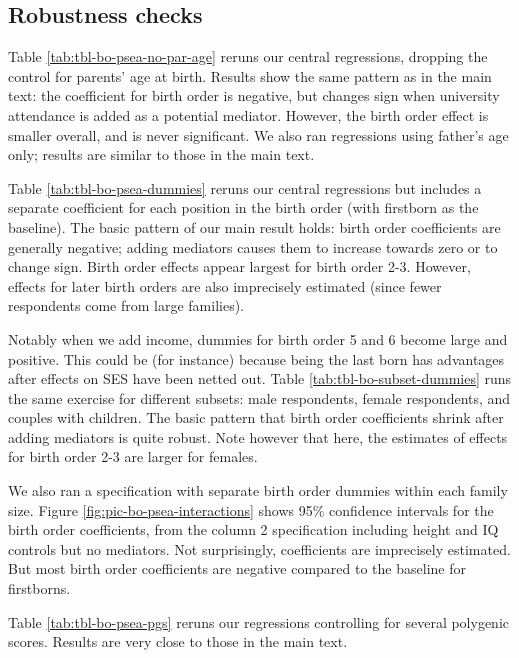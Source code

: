\documentclass[
]{article}
\theoremstyle{definition}
\theoremstyle{definition}
\theoremstyle{definition}
\theoremstyle{definition}
\theoremstyle{remark}
\begin{document}
\FloatBarrier

\newpage

\hypertarget{robustness-checks}{%
\subsection{Robustness checks}\label{robustness-checks}}

Table \ref{tab:tbl-bo-psea-no-par-age} reruns our central regressions,
dropping the control for parents' age at birth. Results show the same
pattern as in the main text: the coefficient for birth order is
negative, but changes sign when university attendance is added as a
potential mediator. However, the birth order effect is smaller overall,
and is never significant. We also ran regressions using father's age
only; results are similar to those in the main text.

Table \ref{tab:tbl-bo-psea-dummies} reruns our central regressions but
includes a separate coefficient for each position in the birth order
(with firstborn as the baseline). The basic pattern of our main result
holds: birth order coefficients are generally negative; adding mediators
causes them to increase towards zero or to change sign. Birth order
effects appear largest for birth order 2-3. However, effects for later
birth orders are also imprecisely estimated (since fewer respondents
come from large families).

Notably when we add income, dummies for birth order 5 and 6 become large
and positive. This could be (for instance) because being the last born
has advantages after effects on SES have been netted out. Table
\ref{tab:tbl-bo-subset-dummies} runs the same exercise for different
subsets: male respondents, female respondents, and couples with
children. The basic pattern that birth order coefficients shrink after
adding mediators is quite robust. Note however that here, the estimates
of effects for birth order 2-3 are larger for females.

We also ran a specification with separate birth order dummies within
each family size. Figure \ref{fig:pic-bo-psea-interactions} shows 95\%
confidence intervals for the birth order coefficients, from the column 2
specification including height and IQ controls but no mediators. Not
surprisingly, coefficients are imprecisely estimated. But most birth
order coefficients are negative compared to the baseline for firstborns.

Table \ref{tab:tbl-bo-psea-pgs} reruns our regressions controlling for
several polygenic scores. Results are very close to those in the main
text.
\end{document}
